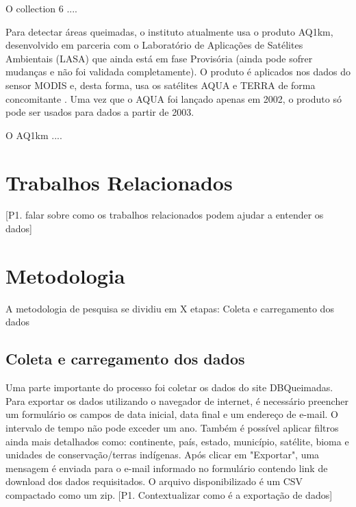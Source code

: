 \documentclass[cic,tc]{iiufrgs}
\begin{document}
O collection 6 .... \citep{GIGLIO2016} \par

Para detectar áreas queimadas, o instituto atualmente usa o produto AQ1km, 
desenvolvido em parceria com o Laboratório de Aplicações de Satélites Ambientais 
(LASA) \citep{SiteAQ1km} que ainda está em fase Provisória (ainda pode sofrer 
mudanças e não foi validada completamente). O produto é aplicados nos dados do 
sensor MODIS e, desta forma, usa os satélites AQUA e TERRA de forma 
concomitante \citep{libonati2015algorithm}. Uma vez que o AQUA foi lançado apenas 
em 2002, o produto só pode ser usados para dados a partir de 2003. \par

O AQ1km .... \citep{libonati2015algorithm} \par


\chapter{Trabalhos Relacionados}

[P1. falar sobre como os trabalhos relacionados podem ajudar a entender 
os dados] \par



\chapter{Metodologia}

A metodologia de pesquisa se dividiu em X etapas: Coleta e carregamento dos dados \par


\section{Coleta e carregamento dos dados}

Uma parte importante do processo foi coletar os dados do site DBQueimadas. 
Para exportar os dados utilizando o navegador de internet, é necessário 
preencher um formulário os campos de data inicial,
data final e um endereço de e-mail. O intervalo de tempo não 
pode exceder um ano. Também é possível aplicar filtros ainda mais 
detalhados como: continente, país, estado, município, satélite, bioma e 
unidades de conservação/terras indígenas. Após clicar em "Exportar", 
uma mensagem é enviada para o e-mail informado no formulário contendo link de 
download dos dados requisitados. O arquivo disponibilizado é um CSV compactado 
como um zip. [P1. Contextualizar como é a exportação de dados]\par
\end{document}
